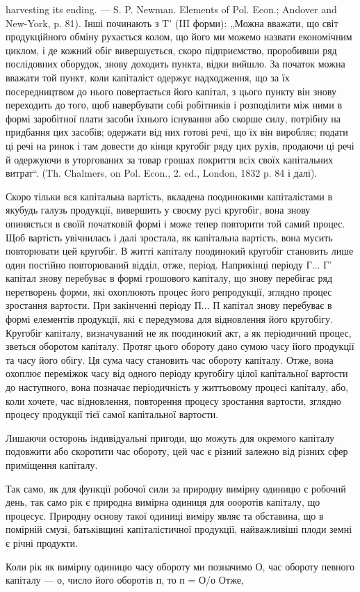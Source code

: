 \parcont{}  %
harvesting its ending. — S. P. Newman. Elements of Pol. Econ.; Andover
and New-York, p. 81). Інші починають з T' (III форми): „Можна вважати,
що світ продукційного обміну рухається колом, що його ми можемо
назвати економічним циклом, і де кожний обіг вивершується, скоро підприємство,
проробивши ряд послідовних оборудок, знову доходить пункта,
відки вийшло. За початок можна вважати той пункт, коли капіталіст
одержує надходження, що за їх посередництвом до нього повертається
його капітал, з цього пункту він знову переходить до того, щоб навербувати
собі робітників і розподілити між ними в формі заробітної плати
засоби їхнього існування або скорше силу, потрібну на придбання цих
засобів; одержати від них готові речі, що їх він виробляє; подати ці
речі на ринок і там довести до кінця кругобіг ряду цих рухів, продаючи
ці речі й одержуючи в уторгованих за товар грошах покриття всіх своїх
капітальних витрат“. (Th. Chalmers, on Pol. Econ., 2. ed., London, 1832 p.
84 і далі).

Скоро тільки вся капітальна вартість, вкладена поодинокими капіталістами
в якубудь галузь продукції, вивершить у своєму русі кругобіг,
вона знову опиняється в своїй початковій формі і може тепер повторити
той самий процес. Щоб вартість увічнилась і далі зростала, як капітальна
вартість, вона мусить повторювати цей кругобіг. В житті капіталу поодинокий
кругобіг становить лише один постійно повторюваний відділ,
отже, період. Наприкінці періоду Г... Г' капітал знову перебуває в формі
грошового капіталу, що знову перебігає ряд перетворень форми, які
охоплюють процес його репродукції, зглядно процес зростання вартости.
При закінченні періоду П... П капітал знову перебуває в формі елементів
продукції, які є передумова для відновлення його кругобігу. Кругобіг
капіталу, визначуваний не як поодинокий акт, а як періодичний процес,
зветься оборотом капіталу. Протяг цього обороту дано сумою часу
його продукції та часу його обігу. Ця сума часу становить час обороту
капіталу. Отже, вона охоплює переміжок часу від одного періоду кругобігу
цілої капітальної вартости до наступного, вона позначає періодичність
у життьовому процесі капіталу, або, коли хочете, час відновлення, повторення
процесу зростання вартости, зглядно процесу продукції тієї самої
капітальної вартости.

Лишаючи осторонь індивідуальні пригоди, що можуть для окремого
капіталу подовжити або скоротити час обороту, цей час є різний залежно
від різних сфер приміщення капіталу.

Так само, як для функції робочої сили за природну вимірну одиницю
є робочий день, так само рік є природна вимірна одиниця для оооротів капіталу,
що процесує. Природну основу такої одиниці виміру являє та обставина,
що в помірній смузі, батьківщині капіталістичної продукції, найважливіші
плоди земні є річні продукти.

Коли рік як вимірну одиницю часу обороту ми позначимо О, час
обороту певного капіталу — о, число його оборотів п, то п = О/о Отже,
\parbreak{}  %
